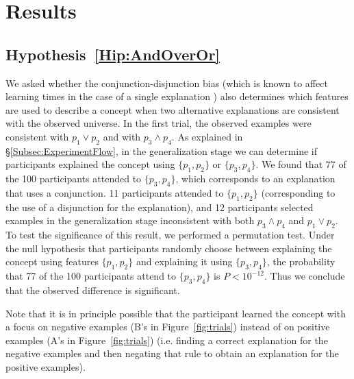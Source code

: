 
\section{Results}\label{Results}


\subsection{Hypothesis~\ref{Hip:AndOverOr}}\label{Results:AndOverOr}
We asked whether the conjunction-disjunction bias (which is known to affect learning times in the case of a single explanation \cite{bourne1970knowing}) also determines which features are used to describe a concept when two alternative explanations are consistent with the observed universe. In the first trial, the observed examples were consistent with $p_1 \vee p_2$ and with $p_3 \wedge p_4$. As explained in \S\ref{Subsec:ExperimentFlow}, in the generalization stage we can determine if participants explained the concept using $\{p_1,p_2\}$ or $\{p_3,p_4\}$. We found that 77 of the 100 participants attended to $\{p_3,p_4\}$, which corresponds to an explanation that uses a conjunction. 11 participants attended to $\{p_1,p_2\}$ (corresponding to the use of a disjunction for the explanation), and 12 participants selected examples in the generalization stage inconsistent with both $p_3 \wedge p_4$ and $p_1 \vee p_2$. To test the significance of this result, we performed a permutation test. Under the null hypothesis that participants randomly choose between explaining the concept using features $\{p_1,p_2\}$ and explaining it using $\{p_3,p_4\}$, the probability that 77 of the 100 participants attend to $\{p_3,p_4\}$ is $P<10^{-12}$. Thus we conclude that the observed difference is significant. 

Note that it is in principle possible that the participant learned the concept with a focus on negative examples ({\sf B}'s in Figure~\ref{fig:trials}) instead of on positive examples ({\sf A}'s in Figure~\ref{fig:trials}) (i.e. finding a correct explanation for the negative examples and then negating that rule to obtain an explanation for the positive examples). 

